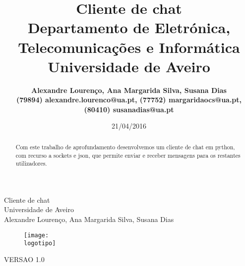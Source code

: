 \documentclass{report}
\begin{document}
%
\def\titulo{Cliente de chat}
\def\data{21/04/2016}
\def\autores{Alexandre Lourenço, Ana Margarida Silva, Susana Dias}
\def\autorescontactos{(79894) alexandre.lourenco@ua.pt, (77752) margaridaocs@ua.pt, (80410) susanadias@ua.pt}
\def\versao{VERSAO 1.0}
\def\departamento{Departamento de Eletrónica, Telecomunicações e Informática}
\def\empresa{Universidade de Aveiro}
\def\logotipo{ua.pdf}
%
%
\begin{titlepage}

\begin{center}
%
\vspace*{50mm}
%
{\Huge \titulo}\\ 
%
\vspace{10mm}
%
{\Large \empresa}\\
%
\vspace{10mm}
%
{\LARGE \autores}\\
%
\vspace{30mm}
%
\begin{figure}[h]
\center
\texttt{[image: \\logotipo]}
\end{figure}
%
\vspace{30mm}
\end{center}
%
\begin{flushright}
\versao
\end{flushright}
\end{titlepage}

\title{
{\Huge\textbf{\titulo}}\\
{\Large \departamento\\ \empresa}
}
%
\author{
\textbf{
    {\center \autores } \\
    {\center \autorescontactos} \\
}
}

\date{\data}

\maketitle


\begin{abstract}
Com este trabalho de aprofundamento desenvolvemos um cliente de chat em python, com recurso a sockets e json, que permite enviar e receber mensagens para os restantes utilizadores.
\end{abstract}

\end{document}
